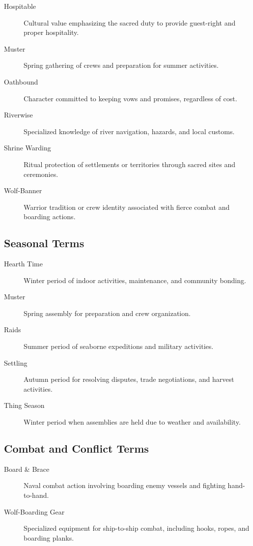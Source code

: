 \documentclass[11pt]{article}
\begin{document}
\begin{description}
    \item[Hospitable] Cultural value emphasizing the sacred duty to provide guest-right and proper hospitality.
    
    \item[Muster] Spring gathering of crews and preparation for summer activities.
    
    \item[Oathbound] Character committed to keeping vows and promises, regardless of cost.
    
    \item[Riverwise] Specialized knowledge of river navigation, hazards, and local customs.
    
    \item[Shrine Warding] Ritual protection of settlements or territories through sacred sites and ceremonies.
    
    \item[Wolf-Banner] Warrior tradition or crew identity associated with fierce combat and boarding actions.
\end{description}

\subsection{Seasonal Terms}

\begin{description}
    \item[Hearth Time] Winter period of indoor activities, maintenance, and community bonding.
    
    \item[Muster] Spring assembly for preparation and crew organization.
    
    \item[Raids] Summer period of seaborne expeditions and military activities.
    
    \item[Settling] Autumn period for resolving disputes, trade negotiations, and harvest activities.
    
    \item[Thing Season] Winter period when assemblies are held due to weather and availability.
\end{description}

\subsection{Combat and Conflict Terms}

\begin{description}
    \item[Board \& Brace] Naval combat action involving boarding enemy vessels and fighting hand-to-hand.
    
    \item[Wolf-Boarding Gear] Specialized equipment for ship-to-ship combat, including hooks, ropes, and boarding planks.
\end{description}
\end{document}
